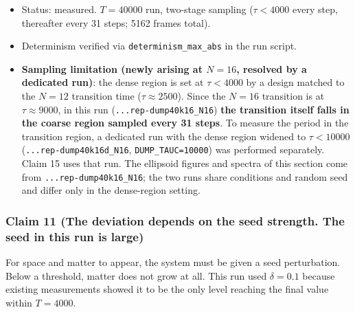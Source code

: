 \documentclass[
  10pt,
]{article}
\providecommand{\tightlist}{%
  \setlength{\itemsep}{0pt}\setlength{\parskip}{0pt}}
\begin{document}
\begin{itemize}
\tightlist
\item
  Status: measured. \(T=40000\) run, two-stage sampling (\(\tau<4000\)
  every step, thereafter every 31 steps; 5162 frames total).
\item
  Determinism verified via \texttt{determinism\_max\_abs} in the run
  script.
\item
  \textbf{Sampling limitation (newly arising at \(N=16\), resolved by a
  dedicated run)}: the dense region is set at \(\tau<4000\) by a design
  matched to the \(N=12\) transition time (\(\tau\approx2500\)). Since
  the \(N=16\) transition is at \(\tau\approx9000\), in this run
  (\texttt{...rep-dump40k16\_N16}) \textbf{the transition itself falls
  in the coarse region sampled every 31 steps}. To measure the period in
  the transition region, a dedicated run with the dense region widened
  to \(\tau<10000\) (\texttt{...rep-dump40k16d\_N16},
  \texttt{DUMP\_TAUC=10000}) was performed separately. Claim 15 uses
  that run. The ellipsoid figures and spectra of this section come from
  \texttt{...rep-dump40k16\_N16}; the two runs share conditions and
  random seed and differ only in the dense-region setting.
\end{itemize}

\subsubsection{Claim 11 (The deviation depends on the seed strength. The
seed in this run is
large)}\label{claim-11-the-deviation-depends-on-the-seed-strength.-the-seed-in-this-run-is-large}

For space and matter to appear, the system must be given a seed
perturbation. Below a threshold, matter does not grow at all. This run
used \(\delta = 0.1\) because existing measurements showed it to be the
only level reaching the final value within \(T = 4000\).
\end{document}

